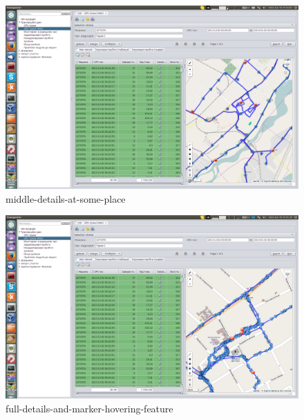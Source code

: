 \begin{figure}[!htp]
\centering
\includegraphics[width=16cm]{chapters/02-gpstracks/images/19-middle-details-at-some-place.png}
\caption{middle-details-at-some-place}\label{fig:19}
\end{figure}

\begin{figure}[!htp]
\centering
\includegraphics[width=16cm]{chapters/02-gpstracks/images/20-full-details-and-marker-hovering-feature.png}
\caption{full-details-and-marker-hovering-feature}\label{fig:20}
\end{figure}